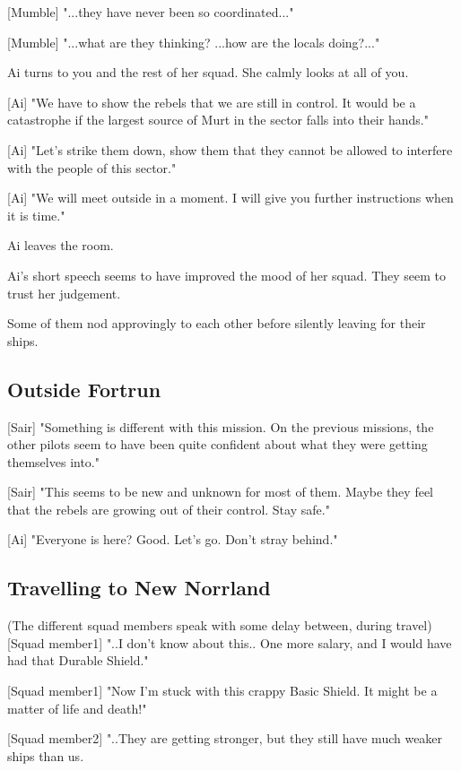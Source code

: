\documentclass[a4paper,12pt]{article}
\begin{document}
[Mumble] "...they have never been so coordinated..."

[Mumble] "...what are they thinking? ...how are the locals doing?..."

Ai turns to you and the rest of her squad. She calmly looks at all of you.

[Ai] "We have to show the rebels that we are still in control. It would be a catastrophe if the largest source of
Murt in the sector falls into their hands." 

[Ai] "Let's strike them down, show them that they cannot be allowed to interfere with the people of this sector."

[Ai] "We will meet outside in a moment. I will give you further instructions when it is time."

Ai leaves the room.

Ai's short speech seems to have improved the mood of her squad. They seem to trust her
judgement. 

Some of them nod approvingly to each other before silently leaving for their ships.

\subsection{Outside Fortrun}

[Sair] "Something is different with this mission. On the previous missions, the other pilots
seem to have been quite confident about what they were getting themselves into." 

[Sair] "This seems to be new and unknown for most of them. Maybe they feel that the rebels are growing out
of their control. Stay safe."

[Ai] "Everyone is here? Good. Let's go. Don't stray behind."

\subsection{Travelling to New Norrland}

(The different squad members speak with some delay between, during travel)\\

[Squad member1] "..I don't know about this.. One more salary, and I would have had that
Durable Shield."

[Squad member1] "Now I'm stuck with this crappy Basic Shield. It might be a matter of life and death!"

[Squad member2] "..They are getting stronger, but they still have much weaker ships than us. 
\end{document}
